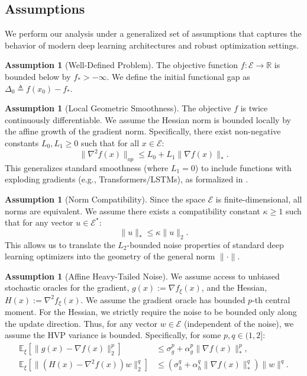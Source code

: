 \documentclass{article}
\theoremstyle{plain}
\theoremstyle{definition}
\newtheorem{assumption}[theorem]{Assumption}
\theoremstyle{remark}
\begin{document}
\subsection{Assumptions}

We perform our analysis under a generalized set of assumptions that captures the behavior of modern deep learning architectures and robust optimization settings.

\begin{assumption}[Well-Defined Problem]
\label{ass:well_defined}
The objective function $f: \mathcal{E} \to \mathbb{R}$ is bounded below by $f_* > -\infty$. We define the initial functional gap as $\Delta_0 \triangleq f(x_0) - f_*$.
\end{assumption}

\begin{assumption}[Local Geometric Smoothness]
\label{ass:geometric_smoothness}
The objective $f$ is twice continuously differentiable. We assume the Hessian norm is bounded locally by the affine growth of the gradient norm. Specifically, there exist non-negative constants $L_0, L_1 \ge 0$ such that for all $x \in \mathcal{E}$:
\begin{equation}
    \|\nabla^2 f(x)\|_{op} \le L_0 + L_1 \|\nabla f(x)\|_*.
\end{equation}
This generalizes standard smoothness (where $L_1=0$) to include functions with exploding gradients (e.g., Transformers/LSTMs), as formalized in \cite{zhang2020adaptive}.
\end{assumption}

\begin{assumption}[Norm Compatibility]
\label{ass:norm_compatibility}
Since the space $\mathcal{E}$ is finite-dimensional, all norms are equivalent. We assume there exists a compatibility constant $\kappa \ge 1$ such that for any vector $u \in \mathcal{E}^*$:
\begin{equation}
    \|u\|_* \le \kappa \|u\|_2.
\end{equation}
This allows us to translate the $L_2$-bounded noise properties of standard deep learning optimizers into the geometry of the general norm $\|\cdot\|$.
\end{assumption}

\begin{assumption}[Affine Heavy-Tailed Noise]
\label{ass:noise}
We assume access to unbiased stochastic oracles for the gradient, $g(x) := \nabla f_\xi(x)$, and the Hessian, $H(x) := \nabla^2 f_\xi(x)$.
We assume the gradient oracle has bounded $p$-th central moment.
For the Hessian, we strictly require the noise to be bounded only along the update direction. Thus, for any vector $w \in \mathcal{E}$ (independent of the noise), we assume the HVP variance is bounded.
Specifically, for some $p, q \in (1, 2]$:
\begin{align}
    \mathbb{E}_\xi[\|g(x) - \nabla f(x)\|_2^p] &\le \sigma_g^p + \alpha_g^p \|\nabla f(x)\|_*^p, \\
    \mathbb{E}_\xi[\|(H(x) - \nabla^2 f(x))w\|_2^q] &\le (\sigma_h^q + \alpha_h^q \|\nabla f(x)\|_*^q) \|w\|^q.
\end{align}
\end{assumption}
\end{document}
